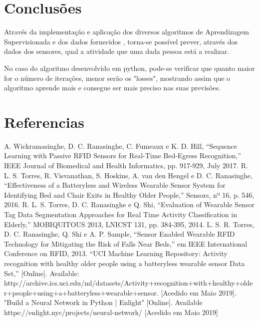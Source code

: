 \documentclass[conference]{IEEEtran}
\begin{document}
\section{Conclusões}

Através da implementação e aplicação dos diversos algoritmos de Aprendizagem Supervisionada e dos dados fornecidos \cite{b5}, torna-se possível prever, através dos dados dos sensores, qual a atividade que uma dada pessoa está a realizar.

No caso do algoritmo desenvolvido em python, pode-se verificar que quanto maior for o número de iterações, menor serão os "losses", mostrando assim que o algoritmo aprende mais e consegue ser mais preciso nas suas previsões.


\section*{Referencias}


\begin{thebibliography}{00}
 A. Wickramasinghe, D. C. Ranasinghe, C. Fumeaux e K. D. Hill, “Sequence Learning with Passive RFID Sensors for Real-Time Bed-Egress Recognition,” IEEE Journal of Biomedical and Health Informatics, pp. 917-929, July 2017.
 R. L. S. Torres, R. Visvanathan, S. Hoskins, A. van den Hengel e D. C. Ranasinghe, “Effectiveness of a Batteryless and Wireless Wearable Sensor System for Identifying Bed and Chair Exits in Healthy Older People,” Sensors, nº 16, p. 546, 2016. 
R. L. S. Torres, D. C. Ranasinghe e Q. Shi, “Evaluation of Wearable Sensor Tag Data Segmentation Approaches for Real Time Activity Classification in Elderly,” MOBIQUITOUS 2013, LNICST 131, pp. 384-395, 2014. 
 L. S. R. Torres, D. C. Ranasinghe, Q. Shi e A. P. Sample, “Sensor Enabled Wearable RFID Technology for Mitigating the Risk of Falls Near Beds,” em IEEE International Conference on RFID, 2013. 
 “UCI Machine Learning Repository: Activity recognition with healthy older people using a batteryless wearable sensor Data Set,” [Online]. Available: http://archive.ics.uci.edu/ml/datasets/Activity+recognition+with+heal\-thy+older+people+using+a+batteryless+wearable+sensor. [Acedido em Maio 2019].
 "Build a Neural Network in Python | Enlight" [Online]. Available https://enlight.nyc/projects/neural-network/ [Acedido em Maio 2019]








\end{thebibliography}
\end{document}
